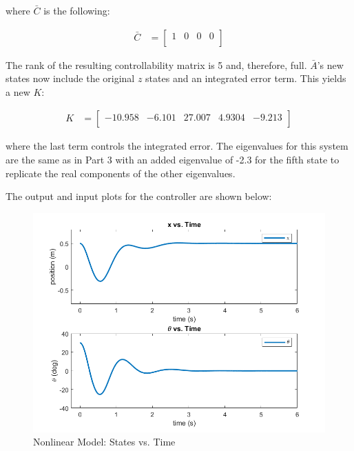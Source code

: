 \documentclass[12pt, letterpaper, onecolumn]{article}
\begin{document}
where $\bar{C}$ is the following:

\begin{equation*}
    \begin{split}
        \bar{C} & =
        \begin{bmatrix}
            1 & 0 & 0 & 0 \\
        \end{bmatrix}
    \end{split}
\end{equation*}

The rank of the resulting controllability matrix is 5 and, therefore, full. $\bar{A}$'s new states now include the original $z$ states and an integrated error term. This yields a new $K$:

\begin{equation*}
    \begin{split}
        K & =
        \begin{bmatrix}
            -10.958 & -6.101 & 27.007 & 4.9304 & -9.213 \\
        \end{bmatrix}
    \end{split}
\end{equation*}

where the last term controls the integrated error. The eigenvalues for this system are the same as in Part 3 with an added eigenvalue of -2.3 for the fifth state to replicate the real components of the other eigenvalues. \\

\clearpage

The output and input plots for the controller are shown below:

\begin{figure}[!h]
    \centering
    \includegraphics[width=\linewidth]{figs/p4-a-states.png}
    \caption{Nonlinear Model: States vs. Time}
    \label{}
\end{figure}
\end{document}
